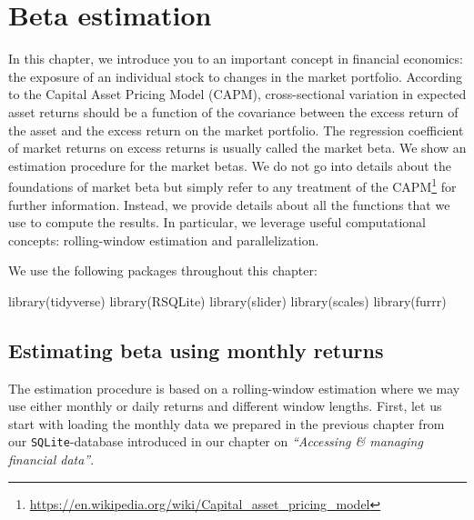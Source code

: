 \documentclass[
]{book}
\newenvironment{Shaded}{\begin{snugshade}}{\end{snugshade}}
\newcommand{\FunctionTok}[1]{\textcolor[rgb]{0,0,0}{#1}}
\newcommand{\NormalTok}[1]{#1}
\renewcommand{\href}[2]{#2\footnote{\url{#1}}}
\begin{document}
\hypertarget{beta-estimation}{%
\chapter{Beta estimation}\label{beta-estimation}}

In this chapter, we introduce you to an important concept in financial economics: the exposure of an individual stock to changes in the market portfolio. According to the Capital Asset Pricing Model (CAPM), cross-sectional variation in expected asset returns should be a function of the covariance between the excess return of the asset and the excess return on the market portfolio. The regression coefficient of market returns on excess returns is usually called the market beta. We show an estimation procedure for the market betas. We do not go into details about the foundations of market beta but simply refer to any treatment of the \href{https://en.wikipedia.org/wiki/Capital_asset_pricing_model}{CAPM} for further information. Instead, we provide details about all the functions that we use to compute the results. In particular, we leverage useful computational concepts: rolling-window estimation and parallelization.

We use the following packages throughout this chapter:

\begin{Shaded}
\begin{Highlighting}[]
\FunctionTok{library}\NormalTok{(tidyverse)}
\FunctionTok{library}\NormalTok{(RSQLite)}
\FunctionTok{library}\NormalTok{(slider)}
\FunctionTok{library}\NormalTok{(scales)}
\FunctionTok{library}\NormalTok{(furrr)}
\end{Highlighting}
\end{Shaded}

\hypertarget{estimating-beta-using-monthly-returns}{%
\section{Estimating beta using monthly returns}\label{estimating-beta-using-monthly-returns}}

The estimation procedure is based on a rolling-window estimation where we may use either monthly or daily returns and different window lengths. First, let us start with loading the monthly data we prepared in the previous chapter from our \texttt{SQLite}-database introduced in our chapter on \emph{``Accessing \& managing financial data''}.
\end{document}
